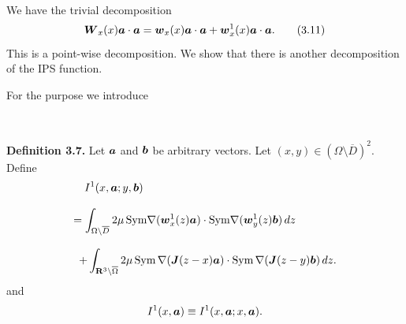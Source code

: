  
 $\quad$
 
 


We have the trivial decomposition
$$\displaystyle
\mbox{\boldmath $W$}_x(x)\mbox{\boldmath $a$}\cdot\mbox{\boldmath $a$}
=\mbox{\boldmath $w$}_x(x)\mbox{\boldmath $a$}\cdot\mbox{\boldmath $a$}
+\mbox{\boldmath $w$}_x^1(x)\mbox{\boldmath $a$}\cdot\mbox{\boldmath $a$}.
\tag {3.11}
$$
This is a point-wise decomposition.
We show that there is another decomposition of  the IPS function.


For the purpose we introduce 

$\quad$

{\bf\noindent Definition 3.7.}
Let $\mbox{\boldmath $a$}$ and $\mbox{\boldmath $b$}$ be arbitrary vectors.
Let $(x,y)\in (\Omega\setminus\overline{D})^2$.  
Define
$$\begin{array}{l}
\displaystyle
\,\,\,\,\,\,
I^1(x,\mbox{\boldmath $a$};y,\mbox{\boldmath $b$})\\
\\
\displaystyle
=\int_{\Omega\setminus\overline{D}}2\mu\,\text{Sym}\nabla(\mbox{\boldmath $w$}_x^1(z)\mbox{\boldmath $a$})
\cdot\text{Sym}\nabla(\mbox{\boldmath $w$}_y^1(z)\mbox{\boldmath $b$})\,dz
\\
\\
\displaystyle
\,\,\,
+
\int_{\Bbb R^3\setminus\overline{\Omega}}
2\mu\,\text{Sym}\,\nabla(\mbox{\boldmath $J$}(z-x)\mbox{\boldmath $a$})
\cdot\text{Sym}\,\nabla(\mbox{\boldmath $J$}(z-y)\mbox{\boldmath $b$})\,dz.
\end{array}
$$
and 
$$\displaystyle
I^1(x,\mbox{\boldmath $a$})\equiv I^1(x,\mbox{\boldmath $a$};x,\mbox{\boldmath $a$}).
$$


$\quad$


